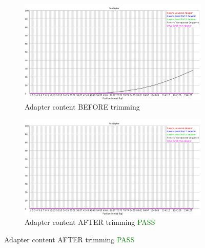 \documentclass{article}
\begin{document}
\begin{figure}[htbp]
\begin{subfigure}{0.45\linewidth}
\includegraphics[width=\linewidth]{04-D15-22373-HT-Nextera-Myeloid-Val1-Repeat_S4_L001_R1_001_fastqc/Images/adapter_content.png}
\caption{Adapter content BEFORE trimming}
\end{subfigure}
\begin{subfigure}{0.45\linewidth}
\includegraphics[width=\linewidth]{04-D15-22373-HT-Nextera-Myeloid-Val1-Repeat_S4_L001_R1_001.qfilter_fastqc/Images/adapter_content.png}
\caption{Adapter content AFTER trimming \textcolor{green}{PASS}}
\end{subfigure}
\end{figure}
\end{document}
